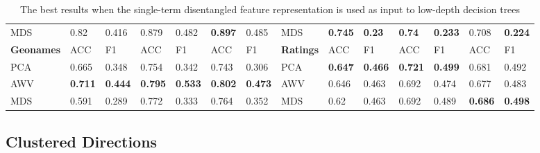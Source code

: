 {\begin{landscape}
\begin{table}[]
\begin{tabular}{llllllllllllll}
MDS        & 0.82                            & 0.416                           & 0.879                           & 0.482                           & \textbf{0.897} & 0.485                           & MDS                             & \textbf{0.745} & \textbf{0.23}  & \textbf{0.74}  & \textbf{0.233} & 0.708                           & \textbf{0.224} \\
\textbf{Geonames}   & ACC                             & F1                              & ACC                             & F1                              & ACC                             & F1                              & \textbf{Ratings}                         & ACC                             & F1                              & ACC                             & F1                              & ACC                             & F1                              \\
\toprule[\heavyrulewidth]
PCA        & 0.665                           & 0.348                           & 0.754                           & 0.342                           & 0.743                           & 0.306                           & PCA                             & \textbf{0.647} & \textbf{0.466} & \textbf{0.721} & \textbf{0.499} & 0.681                           & 0.492                           \\
AWV        & \textbf{0.711} & \textbf{0.444} & \textbf{0.795} & \textbf{0.533} & \textbf{0.802} & \textbf{0.473} & AWV                             & 0.646                           & 0.463                           & 0.692                           & 0.474                           & 0.677                           & 0.483                           \\
MDS        & 0.591                           & 0.289                           & 0.772                           & 0.333                           & 0.764                           & 0.352                           & MDS                             & 0.62                            & 0.463                           & 0.692                           & 0.489                           & \textbf{0.686} & \textbf{0.498}
	\end{tabular}

	\caption{The best results when the single-term disentangled feature representation  is used as input to low-depth decision trees} \label{ch3:singledirs}
\end{table}
\end{landscape}
}

\subsection{Clustered Directions}\label{ch3:clusterexpres}

